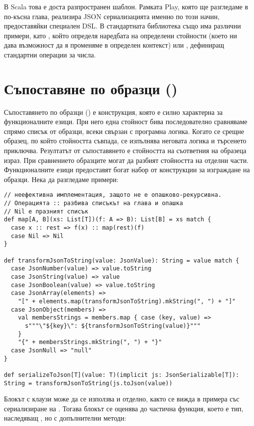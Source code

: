 В Scala това е доста разпространен шаблон. Рамката Play, която ще разгледаме в по-късна глава, реализира JSON сериализацията именно по този начин, предоставяйки специален DSL. В стандартната библиотека също има различни примери, като , който определя наредбата на определени стойности (което ни дава възможност да я променяме в определен контекст) или , дефиниращ стандартни операции за числа.

\section{Съпоставяне по образци ()}

Съпоставянето по образци () е конструкция, която е силно характерна за функционалните езици. При него една стойност бива последователно сравняваме спрямо списък от образци, всеки свързан с програмна логика. Когато се срещне образец, по който стойността съвпада, се изпълнява неговата логика и търсенето приключва. Резултатът от съпоставянето е стойността на съответния на образеца израз. При сравнението образците могат да разбият стойността на отделни части. Функционалните езици предоставят богат набор от конструкции за изграждане на образци. Нека да разгледаме примери:

\begin{lstlisting}[texcl=true]
// неефективна имплементация, защото не е опашково-рекурсивна.
// Операцията :: разбива списъкът на глава и опашка
// Nil е празният списък
def map[A, B](xs: List[T])(f: A => B): List[B] = xs match {
  case x :: rest => f(x) :: map(rest)(f)
  case Nil => Nil
}

def transformJsonToString(value: JsonValue): String = value match {
  case JsonNumber(value) => value.toString
  case JsonString(value) => value
  case JsonBoolean(value) => value.toString
  case JsonArray(elements) =>
    "[" + elements.map(transformJsonToString).mkString(", ") + "]"
  case JsonObject(members) =>
    val membersStrings = members.map { case (key, value) =>
      s"""\"${key}\": ${transformJsonToString(value)}"""
    }
    "{" + membersStrings.mkString(", ") + "}"
  case JsonNull => "null"
}
  
def serializeToJson[T](value: T)(implicit js: JsonSerializable[T]): String = transformJsonToString(js.toJson(value))
\end{lstlisting}

Блокът с  клаузи може да се използва и отделно, както се вижда в примера със сериализиране на . Тогава блокът се оценява до частична функция, което е тип, наследяващ , но с допълнителни методи:

